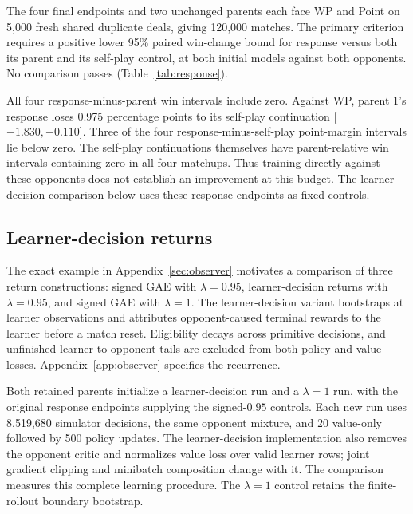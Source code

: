 \documentclass[11pt]{article}
\begin{document}
The four final endpoints and two unchanged parents each face WP and Point on
5,000 fresh shared duplicate deals, giving 120,000 matches. The primary criterion
requires a positive lower 95\% paired win-change bound for response versus both
its parent and its self-play control, at both initial models against both
opponents. No comparison passes (Table~\ref{tab:response}).

\begin{table}[ht]
\centering\small

\caption{Direct opponent training: paired win-score changes in percentage
points, with 95\% intervals, on 5,000 shared development deals. Both trained
arms receive the same simulator budget.}
\label{tab:response}
\end{table}

All four response-minus-parent win intervals include zero. Against WP,
parent 1's response loses 0.975 percentage points to its self-play continuation
[\(-1.830,-0.110\)]. Three of the four response-minus-self-play point-margin intervals lie
below zero. The self-play continuations themselves have
parent-relative win intervals containing zero in all four matchups. Thus
training directly against these opponents does not establish an improvement
at this budget. The learner-decision comparison below uses these response
endpoints as fixed controls.

\subsection{Learner-decision returns}
\label{sec:learner}
The exact example in Appendix~\ref{sec:observer} motivates a comparison of three
return constructions: signed GAE with $\lambda=0.95$, learner-decision returns
with $\lambda=0.95$, and signed GAE with $\lambda=1$. The learner-decision variant
bootstraps at learner observations and attributes opponent-caused terminal
rewards to the learner before a match reset. Eligibility decays across primitive
decisions, and unfinished learner-to-opponent tails are excluded from both
policy and value losses. Appendix~\ref{app:observer} specifies the recurrence.

Both retained parents initialize a learner-decision run and a $\lambda=1$ run,
with the original response endpoints supplying the signed-$0.95$ controls.
Each new run uses 8,519,680 simulator decisions, the same opponent mixture,
and 20 value-only followed by 500 policy updates. The learner-decision
implementation also removes the opponent critic and normalizes value loss over
valid learner rows; joint gradient clipping and minibatch composition change
with it. The comparison measures this complete learning procedure. The
$\lambda=1$ control retains the finite-rollout boundary bootstrap.
\end{document}
